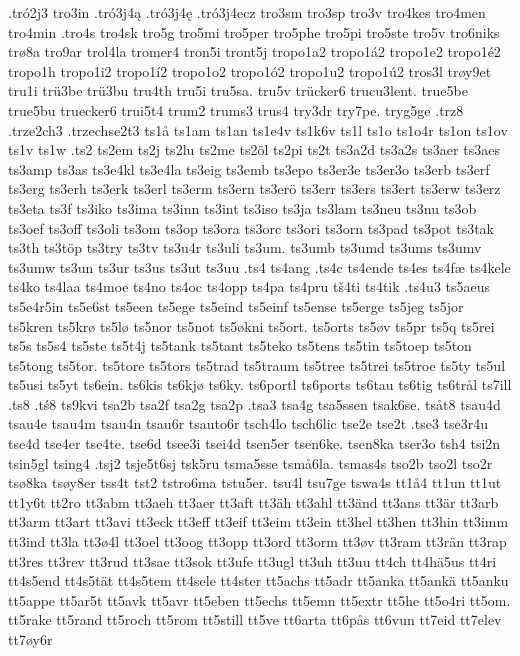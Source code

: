 {{.tró2j3
tro3in
.tró3j4ą
.tró3j4ę
.tró3j4ecz
tro3sm
tro3sp
tro3v
tro4kes
tro4men
tro4min
.tro4s
tro4sk
tro5g
tro5mi
tro5per
tro5phe
tro5pi
tro5ste
tro5v
tro6niks
trø8a
tro9ar
trol4la
tromer4
tron5i
tront5j
tropo1a2
tropo1á2
tropo1e2
tropo1é2
tropo1h
tropo1i2
tropo1í2
tropo1o2
tropo1ó2
tropo1u2
tropo1ú2
tros3l
trøy9et
tru1i
trü3be
trü3bu
tru4th
tru5i
tru5sa.
tru5v
trücker6
trucu3lent.
true5be
true5bu
truecker6
trui5t4
trum2
trums3
trus4
try3dr
try7pe.
tryg5ge
.trz8
.trze2ch3
.trzechse2t3
ts1å
ts1am
ts1an
ts1e4v
ts1k6v
ts1l
ts1o
ts1o4r
ts1on
ts1ov
ts1v
ts1w
.ts2
ts2em
ts2j
ts2lu
ts2me
ts2öl
ts2pi
ts2t
ts3a2d
ts3a2s
ts3aer
ts3aes
ts3amp
ts3as
ts3e4kl
ts3e4la
ts3eig
ts3emb
ts3epo
ts3er3e
ts3er3o
ts3erb
ts3erf
ts3erg
ts3erh
ts3erk
ts3erl
ts3erm
ts3ern
ts3erö
ts3err
ts3ers
ts3ert
ts3erw
ts3erz
ts3eta
ts3f
ts3iko
ts3ima
ts3inn
ts3int
ts3iso
ts3ja
ts3lam
ts3neu
ts3nu
ts3ob
ts3oef
ts3off
ts3oli
ts3om
ts3op
ts3ora
ts3orc
ts3ori
ts3orn
ts3pad
ts3pot
ts3tak
ts3th
ts3töp
ts3try
ts3tv
ts3u4r
ts3uli
ts3um.
ts3umb
ts3umd
ts3ums
ts3umv
ts3umw
ts3un
ts3ur
ts3us
ts3ut
ts3uu
.ts4
ts4ang
.ts4c
ts4ende
ts4es
ts4fæ
ts4kele
ts4ko
ts4laa
ts4moe
ts4no
ts4oc
ts4opp
ts4pa
ts4pru
tš4ti
ts4tik
.ts4u3
ts5aeus
ts5e4r5in
ts5e6st
ts5een
ts5ege
ts5eind
ts5einf
ts5ense
ts5erge
ts5jeg
ts5jor
ts5kren
ts5krø
ts5lø
ts5nor
ts5not
ts5økni
ts5ort.
ts5orts
ts5øv
ts5pr
ts5q
ts5rei
ts5s
ts5s4
ts5ste
ts5t4j
ts5tank
ts5tant
ts5teko
ts5tens
ts5tin
ts5toep
ts5ton
ts5tong
ts5tor.
ts5tore
ts5tors
ts5trad
ts5traum
ts5tree
ts5trei
ts5troe
ts5ty
ts5ul
ts5usi
ts5yt
ts6ein.
ts6kis
ts6kjø
ts6ky.
ts6portl
ts6ports
ts6tau
ts6tig
ts6trål
ts7ill
.ts8
.tś8
ts9kvi
tsa2b
tsa2f
tsa2g
tsa2p
.tsa3
tsa4g
tsa5ssen
tsak6se.
tsåt8
tsau4d
tsau4e
tsau4m
tsau4n
tsau6r
tsauto6r
tsch4lo
tsch6lic
tse2e
tse2t
.tse3
tse3r4u
tse4d
tse4er
tse4te.
tse6d
tsee3i
tsei4d
tsen5er
tsen6ke.
tsen8ka
tser3o
tsh4
tsi2n
tsin5gl
tsing4
.tsj2
tsje5t6sj
tsk5ru
tsma5sse
tsmå6la.
tsmas4s
tso2b
tso2l
tso2r
tsø8ka
tsøy8er
tss4t
tst2
tstro6ma
tstu5er.
tsu4l
tsu7ge
tswa4s
tt1å4
tt1un
tt1ut
tt1y6t
tt2ro
tt3abm
tt3aeh
tt3aer
tt3aft
tt3äh
tt3ahl
tt3änd
tt3ans
tt3är
tt3arb
tt3arm
tt3art
tt3avi
tt3eck
tt3eff
tt3eif
tt3eim
tt3ein
tt3hel
tt3hen
tt3hin
tt3imm
tt3ind
tt3la
tt3ø4l
tt3oel
tt3oog
tt3opp
tt3ord
tt3orm
tt3øv
tt3ram
tt3rän
tt3rap
tt3res
tt3rev
tt3rud
tt3sae
tt3sok
tt3ufe
tt3ugl
tt3uh
tt3uu
tt4ch
tt4hä5us
tt4ri
tt4s5end
tt4s5tät
tt4s5tem
tt4sele
tt4ster
tt5achs
tt5adr
tt5anka
tt5ankä
tt5anku
tt5appe
tt5ar5t
tt5avk
tt5avr
tt5eben
tt5echs
tt5emn
tt5extr
tt5he
tt5o4ri
tt5om.
tt5rake
tt5rand
tt5roch
tt5rom
tt5still
tt5ve
tt6arta
tt6pås
tt6vun
tt7eid
tt7elev
tt7øy6r
}}

